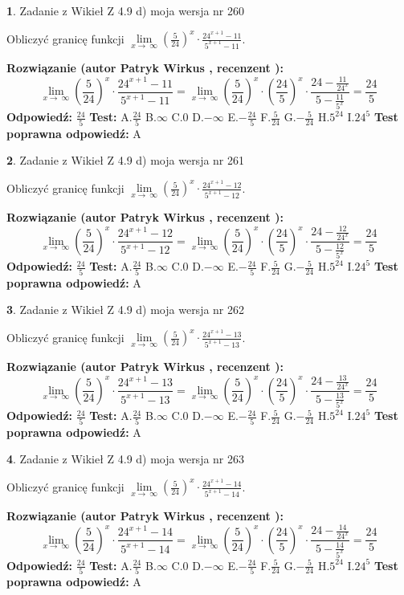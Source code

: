 \documentclass[12pt, a4paper]{article}
\theoremstyle{definition} %
\newtheorem{zad}{}
\newcommand{\zadStart}[1]{\begin{zad}#1\newline}
\newcommand{\zadStop}{\end{zad}}
\newcommand{\rozwStart}[2]{\noindent \textbf{Rozwiązanie (autor #1 , recenzent #2): }\newline}
\newcommand{\rozwStop}{\newline}
\newcommand{\odpStart}{\noindent \textbf{Odpowiedź:}\newline}
\newcommand{\odpStop}{\newline}
\newcommand{\testStart}{\noindent \textbf{Test:}\newline}
\newcommand{\testStop}{\newline}
\newcommand{\kluczStart}{\noindent \textbf{Test poprawna odpowiedź:}\newline}
\newcommand{\kluczStop}{\newline}
\begin{document}
\zadStart{Zadanie z Wikieł Z 4.9 d) moja wersja nr 260}


Obliczyć granicę funkcji  $\lim\limits_{x\to\ \infty}(\frac{5}{24})^{x}\cdot\frac{24^{x+1}-11}{5^{x+1}-11}$.
\zadStop
\rozwStart{Patryk Wirkus}{}
$$\lim\limits_{x\to\ \infty}(\frac{5}{24})^{x}\cdot\frac{24^{x+1}-11}{5^{x+1}-11}=\lim\limits_{x\to\ \infty}(\frac{5}{24})^{x}\cdot(\frac{24}{5})^{x} \cdot \frac{24-\frac{11}{24^{x}}}{5-\frac{11}{5^{x}}} = \frac{24}{5}$$
\rozwStop
\odpStart
$\frac{24}{5}$
\odpStop
\testStart
A.$\frac{24}{5}$ B.$\infty$ C.$0$ D.$-\infty$ E.$-\frac{24}{5}$
F.$\frac{5}{24}$ G.$-\frac{5}{24}$
H.$5^{24}$
I.$24^{5}$
\testStop
\kluczStart
A
\kluczStop



\zadStart{Zadanie z Wikieł Z 4.9 d) moja wersja nr 261}


Obliczyć granicę funkcji  $\lim\limits_{x\to\ \infty}(\frac{5}{24})^{x}\cdot\frac{24^{x+1}-12}{5^{x+1}-12}$.
\zadStop
\rozwStart{Patryk Wirkus}{}
$$\lim\limits_{x\to\ \infty}(\frac{5}{24})^{x}\cdot\frac{24^{x+1}-12}{5^{x+1}-12}=\lim\limits_{x\to\ \infty}(\frac{5}{24})^{x}\cdot(\frac{24}{5})^{x} \cdot \frac{24-\frac{12}{24^{x}}}{5-\frac{12}{5^{x}}} = \frac{24}{5}$$
\rozwStop
\odpStart
$\frac{24}{5}$
\odpStop
\testStart
A.$\frac{24}{5}$ B.$\infty$ C.$0$ D.$-\infty$ E.$-\frac{24}{5}$
F.$\frac{5}{24}$ G.$-\frac{5}{24}$
H.$5^{24}$
I.$24^{5}$
\testStop
\kluczStart
A
\kluczStop



\zadStart{Zadanie z Wikieł Z 4.9 d) moja wersja nr 262}


Obliczyć granicę funkcji  $\lim\limits_{x\to\ \infty}(\frac{5}{24})^{x}\cdot\frac{24^{x+1}-13}{5^{x+1}-13}$.
\zadStop
\rozwStart{Patryk Wirkus}{}
$$\lim\limits_{x\to\ \infty}(\frac{5}{24})^{x}\cdot\frac{24^{x+1}-13}{5^{x+1}-13}=\lim\limits_{x\to\ \infty}(\frac{5}{24})^{x}\cdot(\frac{24}{5})^{x} \cdot \frac{24-\frac{13}{24^{x}}}{5-\frac{13}{5^{x}}} = \frac{24}{5}$$
\rozwStop
\odpStart
$\frac{24}{5}$
\odpStop
\testStart
A.$\frac{24}{5}$ B.$\infty$ C.$0$ D.$-\infty$ E.$-\frac{24}{5}$
F.$\frac{5}{24}$ G.$-\frac{5}{24}$
H.$5^{24}$
I.$24^{5}$
\testStop
\kluczStart
A
\kluczStop



\zadStart{Zadanie z Wikieł Z 4.9 d) moja wersja nr 263}


Obliczyć granicę funkcji  $\lim\limits_{x\to\ \infty}(\frac{5}{24})^{x}\cdot\frac{24^{x+1}-14}{5^{x+1}-14}$.
\zadStop
\rozwStart{Patryk Wirkus}{}
$$\lim\limits_{x\to\ \infty}(\frac{5}{24})^{x}\cdot\frac{24^{x+1}-14}{5^{x+1}-14}=\lim\limits_{x\to\ \infty}(\frac{5}{24})^{x}\cdot(\frac{24}{5})^{x} \cdot \frac{24-\frac{14}{24^{x}}}{5-\frac{14}{5^{x}}} = \frac{24}{5}$$
\rozwStop
\odpStart
$\frac{24}{5}$
\odpStop
\testStart
A.$\frac{24}{5}$ B.$\infty$ C.$0$ D.$-\infty$ E.$-\frac{24}{5}$
F.$\frac{5}{24}$ G.$-\frac{5}{24}$
H.$5^{24}$
I.$24^{5}$
\testStop
\kluczStart
A
\kluczStop
\end{document}
